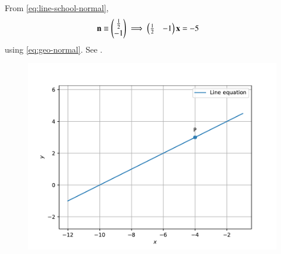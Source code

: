 			From \eqref{eq:line-school-normal},
\begin{align}
\mathbf{n}\equiv \begin{pmatrix}\frac{1}{2}\\ -1\end{pmatrix}
\implies \begin{pmatrix}\frac{1}{2}&-1\end{pmatrix}{\mathbf{x}}&=-5
\end{align}
using \eqref{eq:geo-normal}.
See 
		.
\begin{figure}[h]
\centering
\includegraphics[width=\columnwidth]{chapters/11/10/2/2/figs/fig.pdf}
\caption{}
		\label{fig:chapters/11/10/2/2/Figure}
\end{figure}
